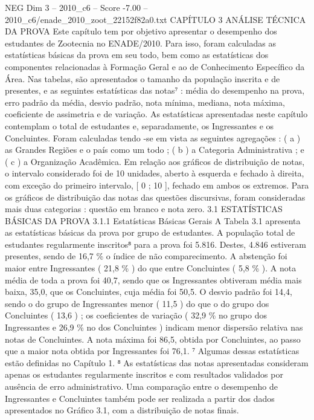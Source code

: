 \begin{textsample}{NEG Dim 3 – 2010\_c6 – Score -7.00 – 2010\_c6/enade\_2010\_zoot\_22152f82a0.txt}  \label{ex:f3_neg_005}
CAPÍTULO 3 ANÁLISE TÉCNICA DA PROVA Este capítulo tem por objetivo apresentar o desempenho dos estudantes de Zootecnia no ENADE/2010.
Para isso, foram calculadas as estatísticas básicas da prova em seu todo, bem como as estatísticas dos componentes relacionadas à Formação Geral e ao de Conhecimento Específico da Área.
Nas tabelas, são apresentados o tamanho da população inscrita e de presentes, e as seguintes estatísticas das notas⁷ : média do desempenho na prova, erro padrão da média, desvio padrão, nota mínima, mediana, nota máxima, coeficiente de assimetria e de variação.
As estatísticas apresentadas neste capítulo contemplam o total de estudantes e, separadamente, os Ingressantes e os Concluintes.
Foram calculadas tendo -se em vista as seguintes agregações : ( a ) as Grandes Regiões e o país como um todo ; ( b ) a Categoria Administrativa ; e ( c ) a Organização Acadêmica.
Em relação aos gráficos de distribuição de notas, o intervalo considerado foi de 10 unidades, aberto à esquerda e fechado à direita, com exceção do primeiro intervalo, [ 0 ; 10 ], fechado em ambos os extremos.
Para os gráficos de distribuição das notas das questões discursivas, foram consideradas mais duas categorias : questão em branco e nota zero. 3.1 ESTATÍSTICAS BÁSICAS DA PROVA 3.1.1 Estatísticas Básicas Gerais A Tabela 3.1 apresenta as estatísticas básicas da prova por grupo de estudantes.
A população total de estudantes regularmente inscritos⁸ para a prova foi 5.816.
Destes, 4.846 estiveram presentes, sendo de 16,7 \% o índice de não comparecimento.
A abstenção foi maior entre Ingressantes ( 21,8 \% ) do que entre Concluintes ( 5,8 \% ).
A nota média de toda a prova foi 40,7, sendo que os Ingressantes obtiveram média mais baixa, 35,0, que os Concluintes, cuja média foi 50,5.
O desvio padrão foi 14,4, sendo o do grupo de Ingressantes menor ( 11,5 ) do que o do grupo dos Concluintes ( 13,6 ) ; os coeficientes de variação ( 32,9 \% no grupo dos Ingressantes e 26,9 \% no dos Concluintes ) indicam menor dispersão relativa nas notas de Concluintes.
A nota máxima foi 86,5, obtida por Concluintes, ao passo que a maior nota obtida por Ingressantes foi 76,1. ⁷ Algumas dessas estatísticas estão definidas no Capítulo 1. ⁸ As estatísticas das notas apresentadas consideram apenas os estudantes regularmente inscritos e com resultados validados por ausência de erro administrativo.
Uma comparação entre o desempenho de Ingressantes e Concluintes também pode ser realizada a partir dos dados apresentados no Gráfico 3.1, com a distribuição de notas finais.

\end{textsample}
